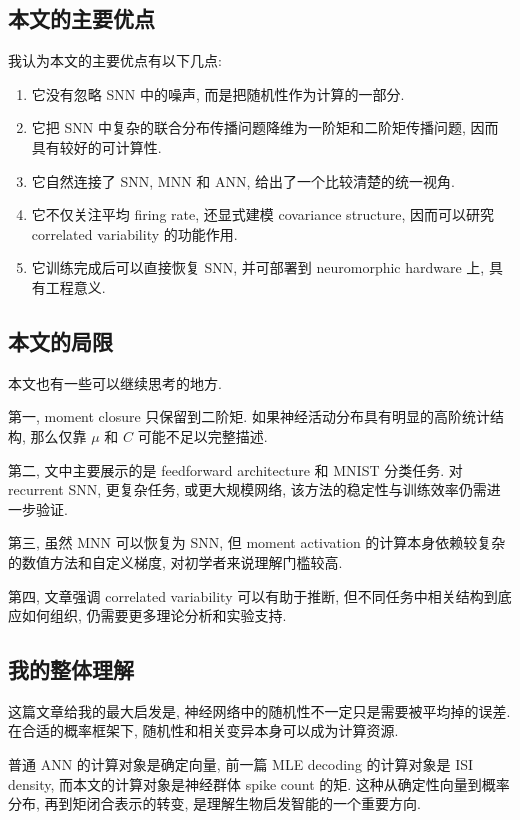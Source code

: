 \documentclass[oneside]{ctexart}
\begin{document}
\subsection{本文的主要优点}

我认为本文的主要优点有以下几点:

\begin{enumerate}[(1)]
    \item 它没有忽略 SNN 中的噪声, 而是把随机性作为计算的一部分.
    \item 它把 SNN 中复杂的联合分布传播问题降维为一阶矩和二阶矩传播问题, 因而具有较好的可计算性.
    \item 它自然连接了 SNN, MNN 和 ANN, 给出了一个比较清楚的统一视角.
    \item 它不仅关注平均 firing rate, 还显式建模 covariance structure, 因而可以研究 correlated variability 的功能作用.
    \item 它训练完成后可以直接恢复 SNN, 并可部署到 neuromorphic hardware 上, 具有工程意义.
\end{enumerate}

\subsection{本文的局限}

本文也有一些可以继续思考的地方.

第一, moment closure 只保留到二阶矩. 如果神经活动分布具有明显的高阶统计结构, 那么仅靠 $\mu$ 和 $C$ 可能不足以完整描述.

第二, 文中主要展示的是 feedforward architecture 和 MNIST 分类任务. 对 recurrent SNN, 更复杂任务, 或更大规模网络, 该方法的稳定性与训练效率仍需进一步验证.

第三, 虽然 MNN 可以恢复为 SNN, 但 moment activation 的计算本身依赖较复杂的数值方法和自定义梯度, 对初学者来说理解门槛较高.

第四, 文章强调 correlated variability 可以有助于推断, 但不同任务中相关结构到底应如何组织, 仍需要更多理论分析和实验支持.

\subsection{我的整体理解}

这篇文章给我的最大启发是, 神经网络中的随机性不一定只是需要被平均掉的误差. 在合适的概率框架下, 随机性和相关变异本身可以成为计算资源.

普通 ANN 的计算对象是确定向量, 前一篇 MLE decoding 的计算对象是 ISI density, 而本文的计算对象是神经群体 spike count 的矩. 这种从确定性向量到概率分布, 再到矩闭合表示的转变, 是理解生物启发智能的一个重要方向.
\end{document}
